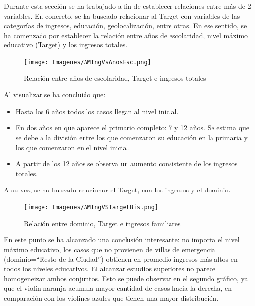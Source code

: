 \documentclass[a4paper]{article}
\begin{document}
        Durante esta sección se ha trabajado a fin de establecer relaciones entre más de 2 variables. En concreto, se ha buscado relacionar al Target con variables de las categorías de ingresos, educación, geolocalización, entre otras.
        En ese sentido, se ha comenzado por establecer la relación entre años de escolaridad, nivel máximo educativo (Target) y los ingresos totales.
 
        \begin{figure}[H]
            \centering
            \texttt{[image: Imagenes/AMIngVsAnosEsc.png]}
            \caption{Relación entre años de escolaridad, Target e ingresos totales}
            \label{AM Scholar Years, Taget and Total Income}
        \end{figure}
 
        Al visualizar se ha concluido que:
 
        \begin{itemize}
            \item Hasta los 6 años todos los casos llegan al nivel inicial.
            \item En dos años en que aparece el primario completo: 7 y 12 años. Se estima que se debe a la división entre los que comenzaron su educación en la primaria y los que comenzaron en el nivel inicial.
            \item A partir de los 12 años se observa un aumento consistente de los ingresos totales.
        \end{itemize}

        A su vez, se ha buscado relacionar el Target, con los ingresos y el dominio.
 
        \begin{figure}[H]
            \centering
            \texttt{[image: Imagenes/AMIngVSTargetBis.png]}
            \caption{Relación entre dominio, Target e ingresos familiares}
            \label{AM Dominio, Taget and Familiar Income}
        \end{figure}

 
        En este punto se ha alcanzado una conclusión interesante: no importa el nivel máximo educativo, los casos que no provienen de villas de emergencia (dominio=``Resto de la Ciudad'') obtienen en promedio ingresos más altos en todos los niveles educativos. El alcanzar estudios superiores no parece homogeneizar ambos conjuntos. Esto se puede observar en el segundo gráfico, ya que el violín naranja acumula mayor cantidad de casos hacia la derecha, en comparación con los violines azules que tienen una mayor distribución.
        
\end{document}
